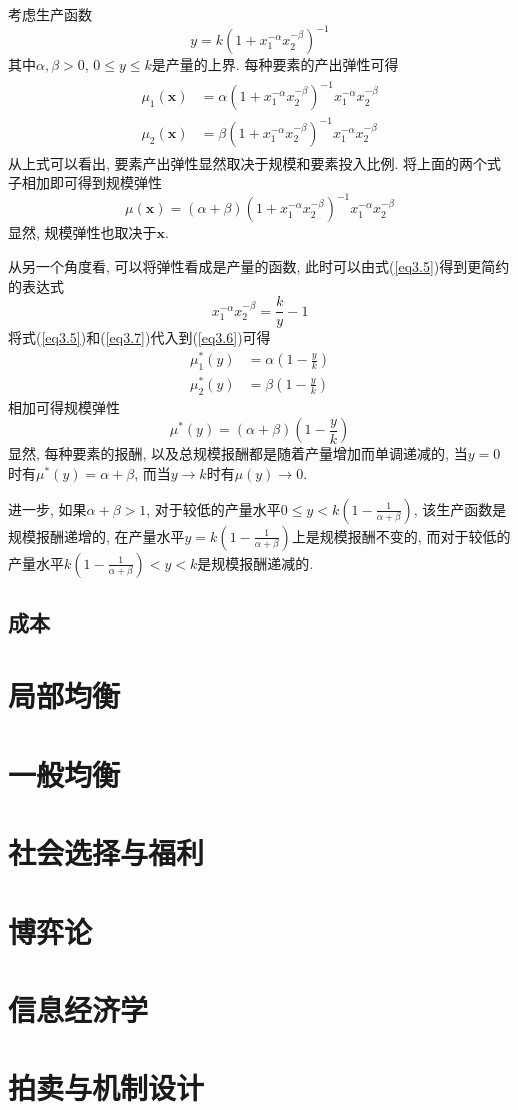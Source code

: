\documentclass[cn, 12pt, math=mtpro2, bibstyle=apa, blue]{elegantbook}
\newcommand{\x}{\mathbf{x}}
\begin{document}
\begin{example}
考虑生产函数
\begin{equation}\label{eq3.5}
  y=k(1+x_1^{-\alpha}x_2^{-\beta})^{-1}
\end{equation}
其中$\alpha,\beta>0$, $0\leq y\leq k$是产量的上界. 每种要素的产出弹性可得
\begin{align}
\begin{split}
\mu_1(\x)&=\alpha(1+x_1^{-\alpha}x_2^{-\beta})^{-1}x_1^{-\alpha}x_2^{-\beta} \\
\mu_2(\x)&=\beta(1+x_1^{-\alpha}x_2^{-\beta})^{-1}x_1^{-\alpha}x_2^{-\beta}
\end{split}
\label{eq3.6}
\end{align}
从上式可以看出, 要素产出弹性显然取决于规模和要素投入比例. 将上面的两个式子相加即可得到规模弹性
$$\mu(\x)=(\alpha+\beta)(1+x_1^{-\alpha}x_2^{-\beta})^{-1}x_1^{-\alpha}x_2^{-\beta}$$
显然, 规模弹性也取决于$\x$.

从另一个角度看, 可以将弹性看成是产量的函数, 此时可以由式(\ref{eq3.5})得到更简约的表达式
\begin{equation}\label{eq3.7}
  x_1^{-\alpha}x_2^{-\beta}=\frac{k}{y}-1
\end{equation}
将式(\ref{eq3.5})和(\ref{eq3.7})代入到(\ref{eq3.6})可得
\begin{align*}
\mu_1^\ast(y)&=\alpha\left(1-\frac{y}{k}\right) \\
\mu_2^\ast(y)&=\beta\left(1-\frac{y}{k}\right)
\end{align*}
相加可得规模弹性
$$\mu^\ast(y)=(\alpha+\beta)\left(1-\frac{y}{k}\right)$$
显然, 每种要素的报酬, 以及总规模报酬都是随着产量增加而单调递减的, 当$y=0$时有$\mu^\ast(y)=\alpha+\beta$, 而当$y\to k$时有$\mu(y)\to 0$.

进一步, 如果$\alpha+\beta>1$, 对于较低的产量水平$\displaystyle 0\leq y<k\left(1-\frac{1}{\alpha+\beta}\right)$, 该生产函数是规模报酬递增的, 在产量水平$\displaystyle y=k\left(1-\frac{1}{\alpha+\beta}\right)$上是规模报酬不变的, 而对于较低的产量水平$\displaystyle k\left(1-\frac{1}{\alpha+\beta}\right)<y<k$是规模报酬递减的.
\end{example}
\section{成本}
\chapter{局部均衡}

\chapter{一般均衡}

\chapter{社会选择与福利}

\chapter{博弈论}

\chapter{信息经济学}

\chapter{拍卖与机制设计}
\end{document}
